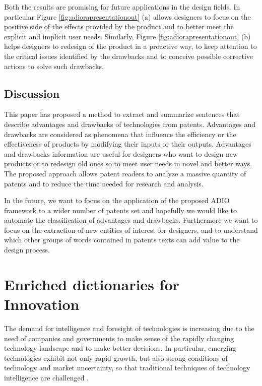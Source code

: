 \documentclass[]{book}
\begin{document}
Both the results are promising for future applications in the design
fields. In particular Figure \ref{fig:adiorapresentationout} (a) allows
designers to focus on the positive side of the effects provided by the
product and to better meet the explicit and implicit user needs.
Similarly, Figure \ref{fig:adiorapresentationout} (b) helps designers to
redesign of the product in a proactive way, to keep attention to the
critical issues identified by the drawbacks and to conceive possible
corrective actions to solve such drawbacks.

\section{Discussion}\label{discussion}

This paper has proposed a method to extract and summarize sentences that
describe advantages and drawbacks of technologies from patents.
Advantages and drawbacks are considered as phenomena that influence the
efficiency or the effectiveness of products by modifying their inputs or
their outputs. Advantages and drawbacks information are useful for
designers who want to design new products or to redesign old ones so to
meet user needs in novel and better ways. The proposed approach allows
patent readers to analyze a massive quantity of patents and to reduce
the time needed for research and analysis.

In the future, we want to focus on the application of the proposed ADIO
framework to a wider number of patents set and hopefully we would like
to automate the classification of advantages and drawbacks. Furthermore
we want to focus on the extraction of new entities of interest for
designers, and to understand which other groups of words contained in
patents texts can add value to the design process.

\chapter{Enriched dictionaries for
Innovation}\label{enriched-dictionaries-for-innovation}

The demand for intelligence and foresight of technologies is increasing
due to the need of companies and governments to make sense of the
rapidly changing technology landscape and to make better decisions. In
particular, emerging technologies exhibit not only rapid growth, but
also strong conditions of technology and market uncertainty, so that
traditional techniques of technology intelligence are challenged
\citep{rotolo2015emerging}.
\end{document}
